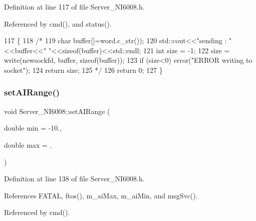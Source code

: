 Definition at line 117 of file Server\+\_\+\+N\+I6008.\+h.



Referenced by cmd(), and status().


\begin{DoxyCode}
117                              \{
118     \textcolor{comment}{/*}
119 \textcolor{comment}{    char buffer[]=word.c\_str()); }
120 \textcolor{comment}{    std::cout<<"sending : "<<buffer<<" "<<sizeof(buffer)<<std::endl;}
121 \textcolor{comment}{    int size = -1;}
122 \textcolor{comment}{    size = write(newsockfd, buffer, sizeof(buffer));}
123 \textcolor{comment}{    if (size<0) error("ERROR writing to socket");}
124 \textcolor{comment}{    return size;}
125 \textcolor{comment}{    */}
126     \textcolor{keywordflow}{return} 0;
127   \}
\end{DoxyCode}
\mbox{\label{classServer__NI6008_a120ec56f6af12d56683322f56a8d7878}} 
\subsubsection{\texorpdfstring{set\+A\+I\+Range()}{setAIRange()}}
{\footnotesize\ttfamily void Server\+\_\+\+N\+I6008\+::set\+A\+I\+Range (\begin{DoxyParamCaption}\item[{double}]{min = {\ttfamily -\/10.},  }\item[{double}]{max = {.} }\end{DoxyParamCaption})\hspace{0.3cm}{\ttfamily [inline]}}



Definition at line 138 of file Server\+\_\+\+N\+I6008.\+h.



References F\+A\+T\+AL, ftos(), m\+\_\+ai\+Max, m\+\_\+ai\+Min, and msg\+Svc().



Referenced by cmd().


